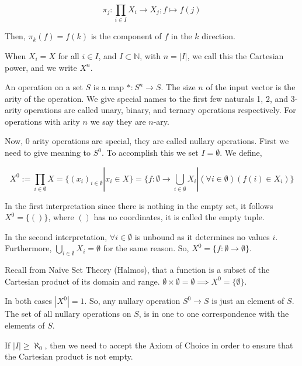 \documentclass{article}
\newcommand\N{\mathbb{N}}
\begin{document}
\[\pi_j : \prod_{i\in I} X_i \rightarrow X_j; f\mapsto f(j)\]

Then, $\pi_k(f) = f(k)$ is the component of $f$ in the $k$ direction.

When $X_i = X$ for all $i\in I$, and $I\subset \N$, with $n = |I|$, we
call this the Cartesian power, and
we write $X^n$.

An operation on a set $S$ is a map $*:S^n\rightarrow S$. The size $n$
of the input vector is the arity of the operation. We give special
names to the first few naturals 1, 2, and 3-arity operations are
called unary, binary, and ternary operations respectively. For
operations with arity $n$ we say they are $n$-ary.

Now, 0 arity operations are special, they are called nullary operations. First we need to give meaning to $S^0$. To
accomplish this we set $I = \emptyset$. We define,

\[X^0 := \prod_{i \in \emptyset} X = \{(x_i)_{i \in \emptyset} | x_i\in X\} =
  \{f:\emptyset \rightarrow \bigcup_{i\in \emptyset} X_i | (\forall
  i\in \emptyset)(f(i) \in X_i)\}\]

In the first interpretation since there is nothing in the empty set,
it follows
$X^0 = \{()\}$, where $()$ has no coordinates, it is called the empty
tuple.

In the second interpretation, $\forall i\in \emptyset$ is unbound as it determines no values $i$. Furthermore,
$\bigcup_{i\in \emptyset} X_i = \emptyset$ for the same reason. So,
$X^0 = \{f:\emptyset\rightarrow \emptyset \}$.

Recall from Na\"ive Set Theory (Halmos), that a function is a subset of the Cartesian
product of its domain and range. $\emptyset \times \emptyset =
\emptyset \implies X^0 = \{\emptyset \}$.

In both cases $|X^0| = 1$. So, any nullary operation $S^0\rightarrow
S$ is just an element of $S$. The set of all nullary operations on
$S$, is in one to one correspondence with the elements of $S$.

If $|I| \geq \aleph_0$, then we need to accept the Axiom of Choice in
order to ensure that the Cartesian product is not empty.
\end{document}
